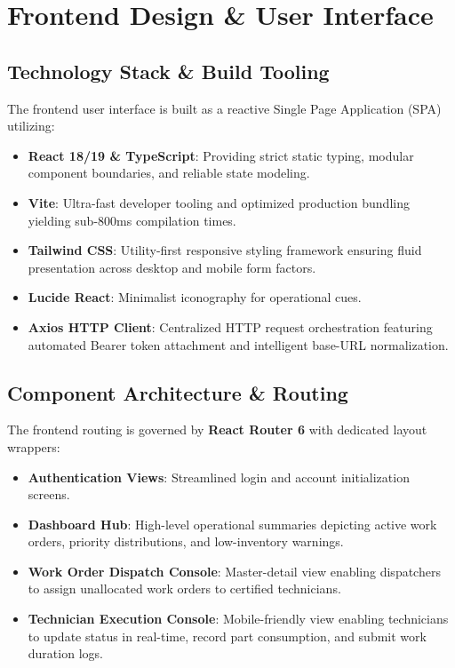 \documentclass[12pt,a4paper,oneside]{report}
\begin{document}
\chapter{Frontend Design \& User Interface}

\section{Technology Stack & Build Tooling}
The frontend user interface is built as a reactive Single Page Application (SPA) utilizing:
\begin{itemize}
    \item \textbf{React 18/19 \& TypeScript}: Providing strict static typing, modular component boundaries, and reliable state modeling.
    \item \textbf{Vite}: Ultra-fast developer tooling and optimized production bundling yielding sub-800ms compilation times.
    \item \textbf{Tailwind CSS}: Utility-first responsive styling framework ensuring fluid presentation across desktop and mobile form factors.
    \item \textbf{Lucide React}: Minimalist iconography for operational cues.
    \item \textbf{Axios HTTP Client}: Centralized HTTP request orchestration featuring automated Bearer token attachment and intelligent base-URL normalization.
\end{itemize}

\section{Component Architecture \& Routing}
The frontend routing is governed by \textbf{React Router 6} with dedicated layout wrappers:
\begin{itemize}
    \item \textbf{Authentication Views}: Streamlined login and account initialization screens.
    \item \textbf{Dashboard Hub}: High-level operational summaries depicting active work orders, priority distributions, and low-inventory warnings.
    \item \textbf{Work Order Dispatch Console}: Master-detail view enabling dispatchers to assign unallocated work orders to certified technicians.
    \item \textbf{Technician Execution Console}: Mobile-friendly view enabling technicians to update status in real-time, record part consumption, and submit work duration logs.
\end{itemize}
\end{document}
